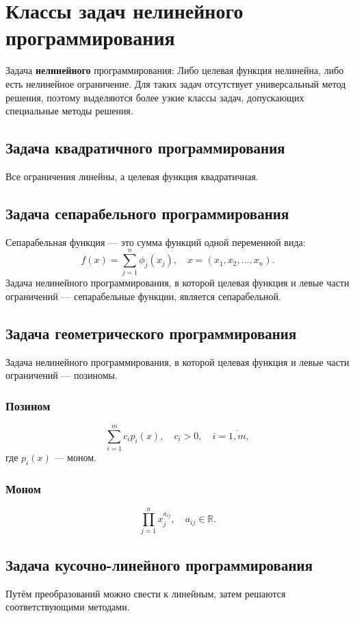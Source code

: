 \documentclass[17pt]{extarticle}
\begin{document}
\section{Классы задач нелинейного программирования}

Задача \textbf{нелинейного} программирования:
Либо целевая функция нелинейна, либо есть нелинейное ограничение. Для таких задач отсутствует универсальный метод решения, поэтому выделяются более узкие классы задач, допускающих специальные методы решения.

\subsection{Задача квадратичного программирования}
Все ограничения линейны, а целевая функция квадратичная.

\subsection{Задача сепарабельного программирования}
Сепарабельная функция — это сумма функций одной переменной вида:
\[
    f(x) = \sum\limits_{j=1}^{n} \phi_j(x_j), \quad x = (x_1, x_2, \dots, x_n).
\]
Задача нелинейного программирования, в которой целевая функция и левые части ограничений — сепарабельные функции, является сепарабельной.

\subsection{Задача геометрического программирования}
Задача нелинейного программирования, в которой целевая функция и левые части ограничений — позиномы.

\subsubsection{Позином}
\[
    \sum\limits_{i=1}^{m} c_i p_i(x), \quad c_i > 0, \quad i = \overline{1,m},
\]
где \( p_i(x) \) — моном.

\subsubsection{Моном}
\[
    \prod\limits_{j=1}^{n} x_j^{a_{ij}}, \quad a_{ij} \in \mathbb{R}.
\]

\subsection{Задача кусочно-линейного программирования}
Путём преобразований можно свести к линейным, затем решаются соответствующими методами.
\end{document}
